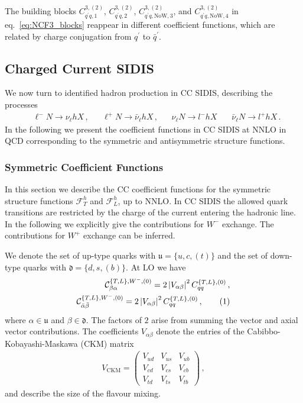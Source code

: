 \documentclass[11pt,a4paper]{article}
\newcommand{\Fcal}{\mathcal{F}}
\newcommand{\Ccal}{\mathcal{C}}
\newcommand{\qp}{{q^\prime}}
\newcommand{\qbp}{{\bar{q}^\prime}}
\newcommand{\CC}{\mathrm{CC}}
\newcommand\numberthis{\addtocounter{equation}{1}\tag{\theequation}}
\newcommand{\NoW}{\mathrm{NoW}}
\begin{document}
The building blocks $C_{\qp q, 1}^{3,(2)}$, $C_{\qp q, 2}^{3,(2)}$, $C_{\qp q, \NoW, 3}^{3,(2)}$, and $C_{\qp q, \NoW, 4}^{3,(2)}$ in eq.~\eqref{eq:NCF3_blocks} reappear in different coefficient functions, which are related by charge conjugation from $\qp$ to $\qbp$.


\subsection{Charged Current SIDIS}
\label{sec:CC}


We now turn to identified hadron production in $\CC$ SIDIS, describing
 the processes
\begin{align}
& \ell^- N \to \nu_\ell h X \, , &
& \ell^+ N \to \bar{\nu}_\ell h X \, ,&
& \nu_{\ell}  N \to l^{-} h X \,  &
& \bar{\nu}_{\ell}  N\to l^{+} h X\, .
\end{align}
In the following we present the coefficient functions in $\CC$ SIDIS at NNLO in QCD corresponding to the symmetric and antisymmetric structure functions.

\subsubsection{Symmetric Coefficient Functions}\label{sec:CCSymmCF}

In this section we describe the CC coefficient functions for the symmetric structure functions $\Fcal^h_T$ and $\Fcal^h_L$, up to NNLO.
In $\CC$ SIDIS the allowed quark transitions are restricted by the charge of the current entering the hadronic line.
In the following we explicitly give the contributions for $W^-$ exchange.
The contributions for $W^+$ exchange can be inferred.

We denote the set of up-type quarks with $\mathfrak{u}=\{u,c,(t)\}$ and the set of down-type quarks with $\mathfrak{d}=\{d,s,(b)\}$. At LO we have
\begin{align*}
\Ccal^{\{T,L\},W^{-},(0)}_{\beta\alpha} = 2\left|V_{\alpha\beta}\right|^2 C^{\{T,L\},(0)}_{qq} \,  ,  \\
\Ccal^{\{T,L\},W^{-},(0)}_{\bar{\alpha}\bar{\beta}} = 2\left|V_{\alpha\beta}\right|^2 C^{\{T,L\},(0)}_{qq} \,  , \numberthis
\end{align*}
where $\alpha \in \mathfrak{u}$ and  $\beta \in \mathfrak{d}$.
The factors of $2$ arise from summing the vector and axial vector contributions.
The coefficients $V_{\alpha\beta}$ denote the entries of the Cabibbo-Kobayashi-Maskawa (CKM) matrix
\begin{align}
V_\mathrm{CKM}=\begin{pmatrix}
V_{ud} & V_{us} & V_{ub}\\
V_{cd} & V_{cs} & V_{cb}\\
V_{td} & V_{ts} & V_{tb}
\end{pmatrix} \, ,
\end{align}
and describe the size of the flavour mixing.
\end{document}

